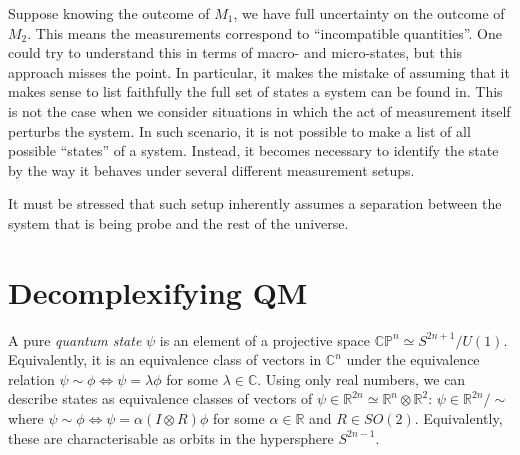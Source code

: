 \documentclass[12pt]{report}
\newcommand{\CC}{\mathbb{C}}
\newcommand{\RR}{\mathbb{R}}
\begin{document}
Suppose knowing the outcome of $M_1$, we have full uncertainty on the outcome of $M_2$. This means the measurements correspond to ``incompatible quantities''.
One could try to understand this in terms of macro- and micro-states, but this approach misses the point. In particular, it makes the mistake of assuming that it makes sense to list faithfully the full set of states a system can be found in.
This is not the case when we consider situations in which the act of measurement itself perturbs the system.
In such scenario, it is not possible to make a list of all possible ``states'' of a system. Instead, it becomes necessary to identify the state by the way it behaves under several different measurement setups.

It must be stressed that such setup inherently assumes a separation between the system that is being probe and the rest of the universe.

\section{Decomplexifying QM}
A pure \emph{quantum state} $\psi$ is an element of a projective space $\mathbb{CP}^n\simeq S^{2n+1}/U(1)$.
Equivalently, it is an equivalence class of vectors in $\CC^{n}$ under the equivalence relation $\psi\sim\phi\Longleftrightarrow \psi=\lambda\phi$ for some $\lambda\in\CC$.
Using only real numbers, we can describe states as equivalence classes of vectors of $\psi\in\RR^{2n}\simeq \RR^n\otimes\RR^2$: $\psi\in\RR^{2n}\!/\!\sim$ where $\psi\sim\phi\Longleftrightarrow \psi=\alpha(I\otimes R)\phi$ for some $\alpha\in\RR$ and $R\in SO(2)$.
Equivalently, these are characterisable as orbits in the hypersphere $S^{2n-1}$.
\end{document}
